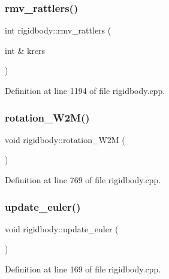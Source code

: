 \subsubsection{\texorpdfstring{rmv\+\_\+rattlers()}{rmv\_rattlers()}}
{\footnotesize\ttfamily int rigidbody\+::rmv\+\_\+rattlers (\begin{DoxyParamCaption}\item[{int \&}]{krcrs }\end{DoxyParamCaption})}



Definition at line 1194 of file rigidbody.\+cpp.

\mbox{\label{classrigidbody_ab0dbd8ea400ec317677675c6298d1243}} 
\subsubsection{\texorpdfstring{rotation\+\_\+\+W2\+M()}{rotation\_W2M()}}
{\footnotesize\ttfamily void rigidbody\+::rotation\+\_\+\+W2M (\begin{DoxyParamCaption}{ }\end{DoxyParamCaption})}



Definition at line 769 of file rigidbody.\+cpp.

\mbox{\label{classrigidbody_a30fc1a6f7cc98cee01b1a0b284c9a461}} 
\subsubsection{\texorpdfstring{update\+\_\+euler()}{update\_euler()}}
{\footnotesize\ttfamily void rigidbody\+::update\+\_\+euler (\begin{DoxyParamCaption}{ }\end{DoxyParamCaption})}



Definition at line 169 of file rigidbody.\+cpp.

\mbox{\label{classrigidbody_af5b3f78c77e8535e2d3f065f66225d3c}} 

